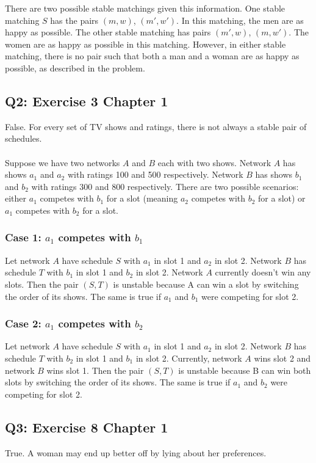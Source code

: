 \documentclass[12pt, oneside]{article}
\begin{document}
There are two possible stable matchings given this information. One stable matching $S$ has the pairs $(m,w)$, $(m',w')$. In this matching, the men are as happy as possible. The other stable matching has pairs $(m',w)$, $(m,w')$. The women are as happy as possible in this matching. However, in either stable matching, there is no pair such that both a man and a woman are as happy as possible, as described in the problem. \\

\subsection*{Q2: Exercise 3 Chapter 1}
False. For every set of TV shows and ratings, there is not always a stable pair of schedules.\\\\
Suppose we have two networks $A$ and $B$ each with two shows. Network $A$ has shows $a_1$ and $a_2$ with ratings 100 and 500 respectively. Network $B$ has shows $b_1$ and $b_2$ with ratings 300 and 800 respectively. There are two possible scenarios: either $a_1$ competes with $b_1$ for a slot (meaning $a_2$ competes with $b_2$ for a slot) or $a_1$ competes with $b_2$ for a slot.\\
\subsubsection*{Case 1: $a_1$ competes with $b_1$}
Let network $A$ have schedule $S$ with $a_1$ in slot 1 and $a_2$ in slot 2. Network $B$ has schedule $T$ with $b_1$ in slot 1 and $b_2$ in slot 2. Network $A$ currently doesn't win any slots. Then the pair $(S,T)$ is unstable because A can win a slot by switching the order of its shows. The same is true if $a_1$ and $b_1$ were competing for slot 2.


\subsubsection*{Case 2: $a_1$ competes with $b_2$}
Let network $A$ have schedule $S$ with $a_1$ in slot 1 and $a_2$ in slot 2. Network $B$ has schedule $T$ with $b_2$ in slot 1 and $b_1$ in slot 2. Currently, network $A$ wins slot 2 and network $B$ wins slot 1. Then the pair $(S,T)$ is unstable because B can win both slots by switching the order of its shows. The same is true if $a_1$ and $b_2$ were competing for slot 2.\\

\subsection*{Q3: Exercise 8 Chapter 1}
True. A woman may end up better off by lying about her preferences.\\
\end{document}
